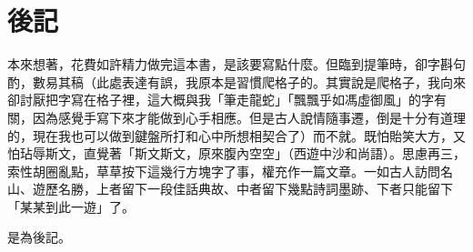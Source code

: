 \chapter*{後記}

本來想著，花費如許精力做完這本書，是該要寫點什麼。但臨到提筆時，卻字斟句酌，數易其稿{\kaishu（此處表達有誤，我原本是習慣爬格子的。其實說是爬格子，我向來卻討厭把字寫在格子裡，這大概與我「筆走龍蛇」「飄飄乎如馮虛御風」的字有關，因為感覺手寫下來才能做到心手相應。但是古人說情隨事遷，倒是十分有道理的，現在我也可以做到鍵盤所打和心中所想相契合了）}而不就。既怕貽笑大方，又怕玷辱斯文，直覺著「斯文斯文，原來腹內空空」（西遊中沙和尚語）。思慮再三，索性胡圈亂點，草草按下這幾行方塊字了事，權充作一篇文章。一如古人訪問名山、遊歷名勝，上者留下一段佳話典故、中者留下幾點詩詞墨跡、下者只能留下「某某到此一遊」了。

是為後記。

\begin{quotation}
\end{quotation}

